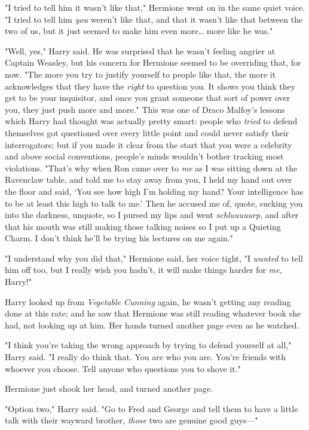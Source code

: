 "I tried to tell him it wasn't like that," Hermione went on in the same quiet 
voice. "I tried to tell him \emph{you} weren't like that, and that it wasn't 
like that between the two of us, but it just seemed to make him even 
more{\ldots} more like he was."

"Well, yes," Harry said. He was surprised that he wasn't feeling angrier at 
Captain Weasley, but his concern for Hermione seemed to be overriding that, for 
now. "The more you try to justify yourself to people like that, the more it 
acknowledges that they have the \emph{right} to question you. It shows you 
think they get to be your inquisitor, and once you grant someone that sort of 
power over you, they just push more and more." This was one of Draco Malfoy's 
lessons which Harry had thought was actually pretty smart: people who 
\emph{tried} to defend themselves got questioned over every little point and 
could never satisfy their interrogators; but if you made it clear from the 
start that you were a celebrity and above social conventions, people's minds 
wouldn't bother tracking most violations. "That's why when Ron came over to 
\emph{me} as I was sitting down at the Ravenclaw table, and told me to stay 
away from you, I held my hand out over the floor and said, `You see how high 
I'm holding my hand? Your intelligence has to be at least this high to talk to 
me.' Then he accused me of, quote, sucking you into the darkness, unquote, so I 
pursed my lips and went \emph{schluuuuurp}, and after that his mouth was still 
making those talking noises so I put up a Quieting Charm. I don't think he'll 
be trying his lectures on me again."

"I understand why you did that," Hermione said, her voice tight, "I 
\emph{wanted} to tell him off too, but I really wish you hadn't, it will make 
things harder for \emph{me,} Harry!"

Harry looked up from \emph{Vegetable Cunning} again, he wasn't getting any 
reading done at this rate; and he saw that Hermione was still reading whatever 
book she had, not looking up at him. Her hands turned another page even as he 
watched.

"I think you're taking the wrong approach by trying to defend yourself at all," 
Harry said. "I really do think that. You are who you are. You're friends with 
whoever you choose. Tell anyone who questions you to shove it."

Hermione just shook her head, and turned another page.

"Option two," Harry said. "Go to Fred and George and tell them to have a little 
talk with their wayward brother, \emph{those} two are genuine good guys---"

